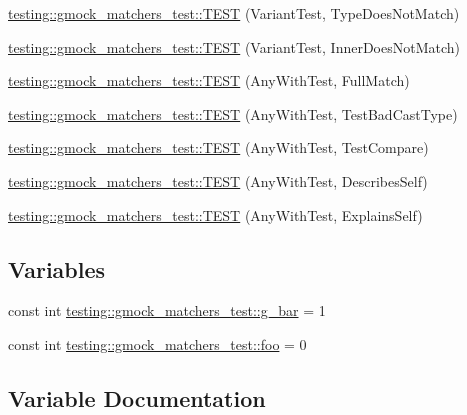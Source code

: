 \begin{DoxyCompactItemize}
\item 
\mbox{\hyperlink{namespacetesting_1_1gmock__matchers__test_a8658fa7df92e4f5476d583fd691b1b88}{testing\+::gmock\+\_\+matchers\+\_\+test\+::\+T\+E\+ST}} (Variant\+Test, Type\+Does\+Not\+Match)
\item 
\mbox{\hyperlink{namespacetesting_1_1gmock__matchers__test_a505e6c087c180d84af53caac65a19e85}{testing\+::gmock\+\_\+matchers\+\_\+test\+::\+T\+E\+ST}} (Variant\+Test, Inner\+Does\+Not\+Match)
\item 
\mbox{\hyperlink{namespacetesting_1_1gmock__matchers__test_a1e590af03119a576f0a1967ad0913e73}{testing\+::gmock\+\_\+matchers\+\_\+test\+::\+T\+E\+ST}} (Any\+With\+Test, Full\+Match)
\item 
\mbox{\hyperlink{namespacetesting_1_1gmock__matchers__test_a3cd540ce4eeb41c7f54469072bcfabac}{testing\+::gmock\+\_\+matchers\+\_\+test\+::\+T\+E\+ST}} (Any\+With\+Test, Test\+Bad\+Cast\+Type)
\item 
\mbox{\hyperlink{namespacetesting_1_1gmock__matchers__test_a028fccc8764077f9b8e2f37b012aaa70}{testing\+::gmock\+\_\+matchers\+\_\+test\+::\+T\+E\+ST}} (Any\+With\+Test, Test\+Compare)
\item 
\mbox{\hyperlink{namespacetesting_1_1gmock__matchers__test_a47e76f27901817ad3fb526172e6ecc00}{testing\+::gmock\+\_\+matchers\+\_\+test\+::\+T\+E\+ST}} (Any\+With\+Test, Describes\+Self)
\item 
\mbox{\hyperlink{namespacetesting_1_1gmock__matchers__test_a5e9f41e9a39a6de9c69d06250d62a67a}{testing\+::gmock\+\_\+matchers\+\_\+test\+::\+T\+E\+ST}} (Any\+With\+Test, Explains\+Self)
\end{DoxyCompactItemize}
\subsection*{Variables}
\begin{DoxyCompactItemize}
\item 
const int \mbox{\hyperlink{namespacetesting_1_1gmock__matchers__test_a55dcc962203a3a3361d2e7e00ed99b4d}{testing\+::gmock\+\_\+matchers\+\_\+test\+::g\+\_\+bar}} = 1
\item 
const int \mbox{\hyperlink{namespacetesting_1_1gmock__matchers__test_a3536e68112ffbb1f76887cd15bb45c15}{testing\+::gmock\+\_\+matchers\+\_\+test\+::foo}} = 0
\end{DoxyCompactItemize}


\subsection{Variable Documentation}
\mbox{\label{_obj__test_2lib_2googletest-release-1_88_81_2googlemock_2test_2gmock-matchers__test_8cc_af7014f387b012eaf69559acac016b3f4}} 
